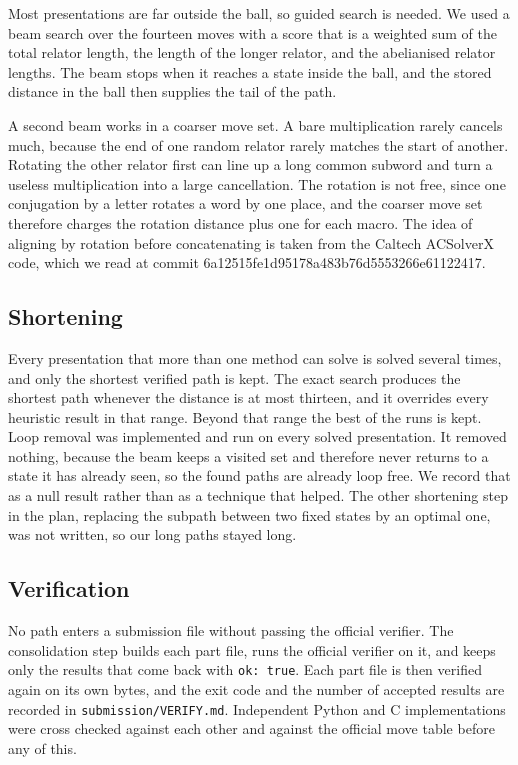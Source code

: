 \documentclass[11pt]{article}
\begin{document}
Most presentations are far outside the ball, so guided search is needed. We used a beam search over the fourteen moves with a score that is a weighted sum of the total relator length, the length of the longer relator, and the abelianised relator lengths. The beam stops when it reaches a state inside the ball, and the stored distance in the ball then supplies the tail of the path.

A second beam works in a coarser move set. A bare multiplication rarely cancels much, because the end of one random relator rarely matches the start of another. Rotating the other relator first can line up a long common subword and turn a useless multiplication into a large cancellation. The rotation is not free, since one conjugation by a letter rotates a word by one place, and the coarser move set therefore charges the rotation distance plus one for each macro. The idea of aligning by rotation before concatenating is taken from the Caltech ACSolverX code, which we read at commit 6a12515fe1d95178a483b76d5553266e61122417.

\subsection{Shortening}

Every presentation that more than one method can solve is solved several times, and only the shortest verified path is kept. The exact search produces the shortest path whenever the distance is at most thirteen, and it overrides every heuristic result in that range. Beyond that range the best of the runs is kept. Loop removal was implemented and run on every solved presentation. It removed nothing, because the beam keeps a visited set and therefore never returns to a state it has already seen, so the found paths are already loop free. We record that as a null result rather than as a technique that helped. The other shortening step in the plan, replacing the subpath between two fixed states by an optimal one, was not written, so our long paths stayed long.

\subsection{Verification}

No path enters a submission file without passing the official verifier. The consolidation step builds each part file, runs the official verifier on it, and keeps only the results that come back with \texttt{ok: true}. Each part file is then verified again on its own bytes, and the exit code and the number of accepted results are recorded in \texttt{submission/VERIFY.md}. Independent Python and C implementations were cross checked against each other and against the official move table before any of this.
\end{document}
